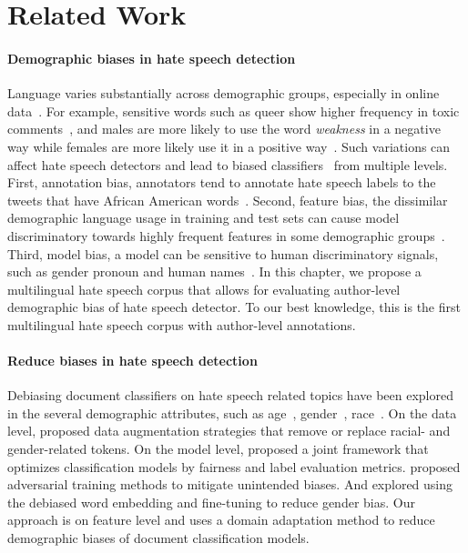 \section{Related Work}

\paragraph{Demographic biases in hate speech detection}
Language varies substantially across demographic groups, especially in online data~\cite{goel2016social, hinds2018demographic}. For example, sensitive words such as queer show higher frequency in toxic comments~\cite{dixon2018measuring}, and males are more likely to use the word \textit{weakness} in a negative way while females are more likely use it in a positive way~\cite{volkova2013exploring}. Such variations can affect hate speech detectors and lead to biased classifiers~\cite{sap2019risk, shah2020predictive} from multiple levels. First, annotation bias, annotators tend to annotate hate speech labels to the tweets that have African American words~\cite{sap2019risk}. Second, feature bias, the dissimilar demographic language usage in training and test sets can cause model discriminatory towards highly frequent features in some demographic groups~\cite{davidson2019racial}. Third, model bias, a model can be sensitive to human discriminatory signals, such as gender pronoun and human names~\cite{kiritchenko2018examining}. 
In this chapter, we propose a multilingual hate speech corpus that allows for evaluating author-level demographic bias of hate speech detector.
To our best knowledge, this is the first multilingual hate speech corpus with author-level annotations.


\paragraph{Reduce biases in hate speech detection}
Debiasing document classifiers on hate speech related topics have been explored in the several demographic attributes, such as age~\cite{diaz2018addressing, gencoglu2020cyberbullying}, gender~\cite{dixon2018measuring, park2018reducing}, race~\cite{davidson2019racial, xia2020demoting}.
On the data level, \cite{dixon2018measuring, davidson2019racial} proposed data augmentation strategies that remove or replace racial- and gender-related tokens.
On the model level, \cite{gencoglu2020cyberbullying} proposed a joint framework that optimizes classification models by fairness and label evaluation metrics. \cite{zhang2018mitigating, xia2020demoting} proposed adversarial training methods to mitigate unintended biases. And \cite{park2018reducing} explored using the debiased word embedding and fine-tuning to reduce gender bias.
Our approach is on feature level and uses a domain adaptation method to reduce demographic biases of document classification models.


